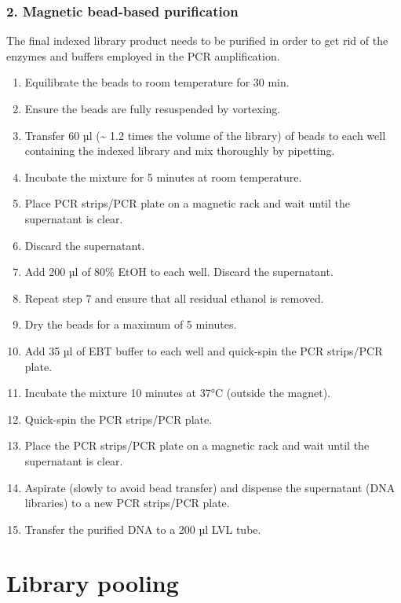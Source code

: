\documentclass[
]{book}
\providecommand{\tightlist}{%
  \setlength{\itemsep}{0pt}\setlength{\parskip}{0pt}}
\begin{document}
\hypertarget{magnetic-bead-based-purification-1}{%
\subsection*{2. Magnetic bead-based purification}\label{magnetic-bead-based-purification-1}}

The final indexed library product needs to be purified in order to get rid of the enzymes and buffers employed in the PCR amplification.

\begin{enumerate}
\def\labelenumi{\arabic{enumi}.}
\tightlist
\item
  Equilibrate the beads to room temperature for 30 min.
\item
  Ensure the beads are fully resuspended by vortexing.
\item
  Transfer 60 µl (\textasciitilde{} 1.2 times the volume of the library) of beads to each well containing the indexed library and mix thoroughly by pipetting.
\item
  Incubate the mixture for 5 minutes at room temperature.
\item
  Place PCR strips/PCR plate on a magnetic rack and wait until the supernatant is clear.
\item
  Discard the supernatant.
\item
  Add 200 µl of 80\% EtOH to each well. Discard the supernatant.
\item
  Repeat step 7 and ensure that all residual ethanol is removed.
\item
  Dry the beads for a maximum of 5 minutes.
\item
  Add 35 µl of EBT buffer to each well and quick-spin the PCR strips/PCR plate.
\item
  Incubate the mixture 10 minutes at 37°C (outside the magnet).
\item
  Quick-spin the PCR strips/PCR plate.
\item
  Place the PCR strips/PCR plate on a magnetic rack and wait until the supernatant is clear.
\item
  Aspirate (slowly to avoid bead transfer) and dispense the supernatant (DNA libraries) to a new PCR strips/PCR plate.
\item
  Transfer the purified DNA to a 200 µl LVL tube.
\end{enumerate}

\hypertarget{library-pooling}{%
\chapter{Library pooling}\label{library-pooling}}
\end{document}
